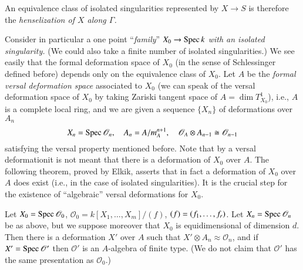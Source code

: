 An equivalence class of isolated singularities represented by $X\to S$
is therefore the {\em henselization of $X$ along $\Gamma$.}

Consider in particular a one point ``{\em family}'' $X_{0}\to \operatorname{Spec} k$
{\em with an isolated singularity.} (We could also take a finite
number of isolated singularities.) We see easily that the formal
deformation space of $X_{0}$ (in the sense of Schlessinger defined
before) depends only on the equivalence class of $X_{0}$. Let $A$ be
the {\em formal versal deformation space} associated to $X_{0}$ (we
can speak of the versal deformation space of $X_{0}$ by taking Zariski
tangent space of $A=\dim T^{1}_{X_{0}}$), i.e., $A$ is a complete
local ring, and we are given a sequence $\{X_{n}\}$ of deformations
over $A_{n}$
$$
X_{n}=\operatorname{Spec} \mathscr{O}_{n},\quad A_{n}=A/m^{n+1}_{A},\quad
\mathscr{O}_{A}\otimes A_{n-1}\cong \mathscr{O}_{n-1} 
$$
satisfying the versal property mentioned before. Note that by a versal 
deformation\pageoriginale it is not meant that there is a deformation
of $X_{0}$ over $A$. The following theorem, proved by Elkik, asserts
that in fact a deformation of $X_{0}$ over $A$ does exist (i.e., in
the case of isolated singularities). It is the crucial step for the
existence of ``algebraic'' versal deformations for $X_{0}$.

\begin{theorem}\label{part2-thm5.1}
Let $X_{0}=\operatorname{Spec} \mathscr{O}_{0}$,
$\mathscr{O}_{0}=k[X_{1},\ldots,X_{m}]/(f)$,
$(f)=(f_{1},\break\ldots,f_{r})$. Let $X_{n}=\operatorname{Spec} \mathscr{O}_{n}$ be as
above, but we suppose moreover that $X_{0}$ is equidimensional of
dimension $d$. Then there is a deformation $X'$ over $A$ such that
$X'\otimes A_{n}\approx \mathscr{O}_{n}$, and if $X'=\operatorname{Spec}
\mathscr{O}'$ then $\mathscr{O}'$ is an $A$-algebra of finite
type. (We do not claim that $\mathscr{O}'$ has the same presentation
as $\mathscr{O}_{0}$.)
\end{theorem}

